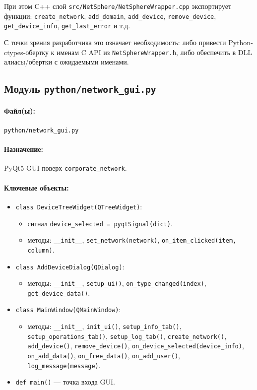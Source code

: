 \documentclass[14pt,a4paper]{extarticle}
\begin{document}
При этом C++ слой \texttt{src/NetSphere/NetSphereWrapper.cpp} экспортирует функции:
\texttt{create\_network}, \texttt{add\_domain}, \texttt{add\_device}, \texttt{remove\_device}, \texttt{get\_device\_info}, \texttt{get\_last\_error} и т.д.

С точки зрения разработчика это означает необходимость:
либо привести Python-ctypes-обертку к именам C API из \texttt{NetSphereWrapper.h},
либо обеспечить в DLL алиасы/обертки с ожидаемыми именами.

\subsection{Модуль \texttt{python/network\_gui.py}}
\paragraph{Файл(ы):} \texttt{python/network\_gui.py}
\paragraph{Назначение:} PyQt5 GUI поверх \texttt{corporate\_network}.
\paragraph{Ключевые объекты:}
\begin{itemize}
  \item \texttt{class DeviceTreeWidget(QTreeWidget)}:
  \begin{itemize}
    \item сигнал \texttt{device\_selected = pyqtSignal(dict)}.
    \item методы: \texttt{\_\_init\_\_}, \texttt{set\_network(network)}, \texttt{on\_item\_clicked(item, column)}.
  \end{itemize}
  \item \texttt{class AddDeviceDialog(QDialog)}:
  \begin{itemize}
    \item методы: \texttt{\_\_init\_\_}, \texttt{setup\_ui()}, \texttt{on\_type\_changed(index)}, \texttt{get\_device\_data()}.
  \end{itemize}
  \item \texttt{class MainWindow(QMainWindow)}:
  \begin{itemize}
    \item методы: \texttt{\_\_init\_\_}, \texttt{init\_ui()}, \texttt{setup\_info\_tab()},
    \texttt{setup\_operations\_tab()}, \texttt{setup\_log\_tab()},
    \texttt{create\_network()}, \texttt{add\_device()}, \texttt{remove\_device()},
    \texttt{on\_device\_selected(device\_info)}, \texttt{on\_add\_data()},
    \texttt{on\_free\_data()}, \texttt{on\_add\_user()}, \texttt{log\_message(message)}.
  \end{itemize}
  \item \texttt{def main()} --- точка входа GUI.
\end{itemize}
\end{document}

